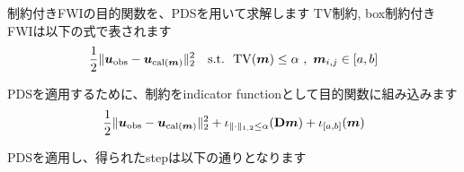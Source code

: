 制約付きFWIの目的関数を、PDSを用いて求解します
TV制約, box制約付きFWIは以下の式で表されます
\begin{equation} \label{eq:FWIObjectiveWithTVConstraint}
\FWIObjectiveWithTVConstraint
\end{equation}

PDSを適用するために、制約をindicator functionとして目的関数に組み込みます
\begin{equation} \label{eq:FWIObjectiveWithTVConstraintWithIndicatorFunction}
\FWIObjectiveWithTVConstraintWithIndicatorFunction
\end{equation}

PDSを適用し、得られたstepは以下の通りとなります
